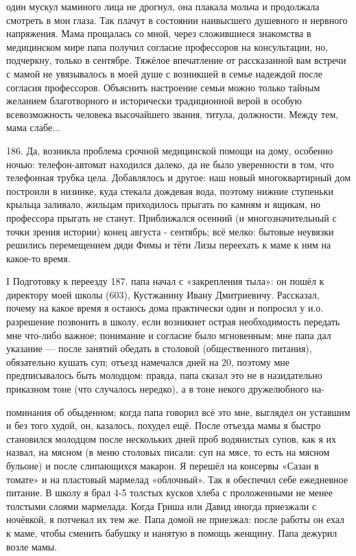 один мускул маминого лица не дрогнул, она плакала мольча и продолжала смотреть в мои глаза. Так плачут в состоянии наивысшего душевного и нервного напряжения. Мама прощалась со мной, через сложившиеся знакомства в медицинском мире папа получил согласие профессоров на консультации, но, подчеркну, только в сентябре. Тяжёлое впечатление от рассказанной вам встречи с мамой не увязывалось в моей душе с возникшей в семье надеждой после согласия профессоров. Объяснить настроение семьи можно только тайным желанием благотворного и исторически традиционной верой в особую всевозможность человека высочайшего звания, титула, должности. Между тем, мама слабе...

186. Да, возникла проблема срочной медицинской помощи на дому, особенно ночью: телефон-автомат находился далеко, да не было уверенности в том, что телефонная трубка цела. Добавлялось и другое: наш новый многоквартирный дом построили в низинке, куда стекала дождевая вода, поэтому нижние ступеньки крыльца заливало, жильцам приходилось прыгать по камням и ящикам, но профессора прыгать не станут. Приближался осенний (и многозначительный с точки зрения истории) конец августа - сентябрь; всё мелко: бытовые неувязки решились перемещением дяди Фимы и тёти Лизы переехать к маме к ним на какое-то время.

I Подготовку к переезду 187. папа начал с «закрепления тыла»: он пошёл к директору моей школы (603), Кустжанину Ивану Дмитриевичу. Рассказал, почему на какое время я остаюсь дома практически один и попросил у и.о. разрешение позвонить в школу, если возникнет острая необходимость передать мне что-либо важное; понимание и согласие было мгновенным; мне папа дал указание — после занятий обедать в столовой (общественного питания), обязательно кушать суп; отъезд намечался дней на 20, поэтому мне предписывалось быть молодцом: правда, папа сказал это не в назидательно приказном тоне (что случалось нередко), а в тоне некого дружелюбного на-

поминания об обыденном; когда папа говорил всё это мне, выглядел он уставшим и без того худой, он, казалось, похудел ещё. После отъезда мамы я быстро становился молодцом после нескольких дней проб водянистых супов, как я их назвал, на мясном (в меню столовых писали: суп на мясе, то есть на мясном бульоне) и после слипающихся макарон. Я перешёл на консервы «Сазан в томате» и на пластовый мармелад «облочный». Так я обеспечил себе ежедневное питание. В школу я брал 4-5 толстых кусков хлеба с проложенными не менее толстыми слоями мармелада. Когда Гриша или Давид иногда приезжали с ночёвкой, я потчевал их тем же. Папа домой не приезжал: после работы он ехал к маме, чтобы сменить бабушку и нанятую в помощь женщину. Папа дежурил возле мамы.

